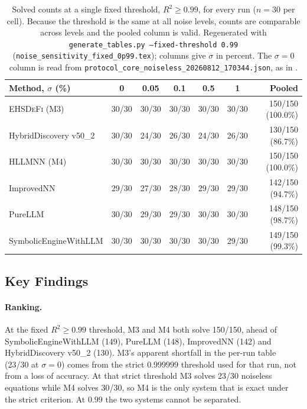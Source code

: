 \documentclass[twoside,11pt]{article}
\newcommand{\EHD}{\textsc{EHSDeFi}}
\newcommand{\HSL}{\textsc{HLLMNN}}
\newcommand{\Rsq}{R^{2}}
\begin{document}
\begin{table}[H]
\centering
\caption{Solved counts at a single fixed threshold, $\Rsq\geq0.99$, for every
  run ($n=30$ per cell). Because the threshold is the same at all noise levels,
  counts are comparable across levels and the pooled column is valid.
  Regenerated with \texttt{generate\_tables.py --fixed-threshold 0.99}
  (\texttt{noise\_sensitivity\_fixed\_0p99.tex}); columns give $\sigma$ in percent. The $\sigma=0$ column is read from \texttt{protocol\_core\_noiseless\_20260812\_170344.json}, as in .}
\label{tab:noise_sensitivity_fixed}
\small
\setlength{\tabcolsep}{4pt}
\begin{tabular}{@{}l c c c c c r@{}}
\toprule
\textbf{Method, $\sigma$ (\%)} & \textbf{0} & \textbf{0.05} & \textbf{0.1} & \textbf{0.5} & \textbf{1} & \textbf{Pooled}\\
\midrule
\EHD{} (M3)            & 30/30 & 30/30 & 30/30 & 30/30 & 30/30 & 150/150 (100.0\%)\\
HybridDiscovery v50\_2 & 30/30 & 24/30 & 26/30 & 24/30 & 26/30 & 130/150 (86.7\%)\\
\HSL{} (M4)            & 30/30 & 30/30 & 30/30 & 30/30 & 30/30 & 150/150 (100.0\%)\\
ImprovedNN             & 29/30 & 27/30 & 28/30 & 29/30 & 29/30 & 142/150 (94.7\%)\\
PureLLM                & 30/30 & 29/30 & 29/30 & 30/30 & 30/30 & 148/150 (98.7\%)\\
SymbolicEngineWithLLM  & 30/30 & 30/30 & 30/30 & 30/30 & 29/30 & 149/150 (99.3\%)\\
\bottomrule
\end{tabular}
\end{table}

\subsection{Key Findings}

\paragraph{Ranking.} At the fixed $\Rsq\geq0.99$ threshold, M3 and M4 both solve
150/150, ahead of SymbolicEngineWithLLM (149), PureLLM (148), ImprovedNN (142)
and HybridDiscovery v50\_2 (130). M3's apparent shortfall in the per-run table
(23/30 at $\sigma=0$) comes from the strict $0.999999$ threshold used for that
run, not from a loss of accuracy. At that strict threshold M3 solves 23/30
noiseless equations while M4 solves 30/30, so M4 is the only system that is exact
under the strict criterion. At $0.99$ the two systems cannot be separated.
\end{document}

